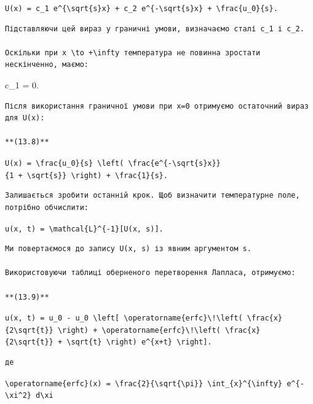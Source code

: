 \documentclass[
  ukrainian,
]{article}
\begin{document}
\texttt{U(x)\ =\ c\_1\ e\^{}\{\textbackslash{}sqrt\{s\}x\}\ +\ c\_2\ e\^{}\{-\textbackslash{}sqrt\{s\}x\}\ +\ \textbackslash{}frac\{u\_0\}\{s\}.}

\begin{verbatim}
Підставляючи цей вираз у граничні умови, визначаємо сталі c_1 і c_2.

Оскільки при x \to +\infty температура не повинна зростати нескінченно, маємо:
\end{verbatim}

c\_1 = 0.

\begin{verbatim}
Після використання граничної умови при x=0 отримуємо остаточний вираз для U(x):

**(13.8)**
\end{verbatim}

\texttt{U(x)\ =\ \textbackslash{}frac\{u\_0\}\{s\}\ \textbackslash{}left(\ \textbackslash{}frac\{e\^{}\{-\textbackslash{}sqrt\{s\}x\}\}\{1\ +\ \textbackslash{}sqrt\{s\}\}\ \textbackslash{}right)\ +\ \textbackslash{}frac\{1\}\{s\}.}

\begin{verbatim}
Залишається зробити останній крок. Щоб визначити температурне поле, потрібно обчислити:
\end{verbatim}

\texttt{u(x,\ t)\ =\ \textbackslash{}mathcal\{L\}\^{}\{-1\}{[}U(x,\ s){]}.}

\begin{verbatim}
Ми повертаємося до запису U(x, s) із явним аргументом s.

Використовуючи таблиці оберненого перетворення Лапласа, отримуємо:

**(13.9)**
\end{verbatim}

\texttt{u(x,\ t)\ =\ u\_0\ -\ u\_0\ \textbackslash{}left{[}\ \textbackslash{}operatorname\{erfc\}\textbackslash{}!\textbackslash{}left(\ \textbackslash{}frac\{x\}\{2\textbackslash{}sqrt\{t\}\}\ \textbackslash{}right)\ +\ \textbackslash{}operatorname\{erfc\}\textbackslash{}!\textbackslash{}left(\ \textbackslash{}frac\{x\}\{2\textbackslash{}sqrt\{t\}\}\ +\ \textbackslash{}sqrt\{t\}\ \textbackslash{}right)\ e\^{}\{x+t\}\ \textbackslash{}right{]}.}

\begin{verbatim}
де
\end{verbatim}

\texttt{\textbackslash{}operatorname\{erfc\}(x)\ =\ \textbackslash{}frac\{2\}\{\textbackslash{}sqrt\{\textbackslash{}pi\}\}\ \textbackslash{}int\_\{x\}\^{}\{\textbackslash{}infty\}\ e\^{}\{-\textbackslash{}xi\^{}2\}\ d\textbackslash{}xi}
\end{document}
